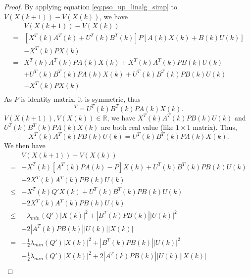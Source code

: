 \documentclass{sig-alternate}
\begin{document}
\begin{proof}
By applying equation \eqref{eq:pso_up_linalg_simp} to $ V( X(k+1) ) - V( X(k) ) $, we have
\begin{equation}
\label{eq:lyapunov_delta2}
\begin{aligned}
& V( X(k+1) ) - V( X(k) ) \\
= & [ X^{T}(k)  A^{T}(k) + U^{T}(k) B^{T}(k) ] P [ A(k) X(k) + B(k) U(k) ] \\ & - X^{T}(k) P X(k) \\
= & X^{T}(k)  A^{T}(k) P A(k) X(k) +  X^{T}(k)  A^{T}(k) P B(k) U(k) \\
& + U^{T}(k) B^{T}(k) P A(k) X(k) + U^{T}(k) B^{T}(k) P B(k) U(k) \\ & - X^{T}(k) P X(k) \\
\end{aligned}
\end{equation}
As $ P $ is identity matrix, it is symmetric, thus
\begin{equation}
[ X^{T}(k)  A^{T}(k) P B(k) U(k) ]^{T} =  U^{T}(k) B^{T}(k) P A(k) X(k).
\end{equation}
$ V( X(k+1) ) , V( X(k) ) \in \mathbb{R} $, 
we have $ X^{T}(k)  A^{T}(k) P B(k) U(k) $ and $  U^{T}(k) B^{T}(k) P A(k) X(k) $ are both real value (like $ 1 \times 1 $ matrix).
Thus, 
\begin{equation}
 X^{T}(k)  A^{T}(k) P B(k) U(k) =   U^{T}(k) B^{T}(k) P A(k) X(k) .
\end{equation}
We then have
\begin{equation}
\label{eq:lyapunov_delta3}
\begin{aligned}
& V( X(k+1) ) - V( X(k) ) \\
= & - X^{T}(k) [ A^{T}(k) P A(k) - P ] X(k) + U^{T}(k) B^{T}(k) P B(k) U(k)  \\
& + 2 X^{T}(k)  A^{T}(k) P B(k) U(k) \\
\leq & - X^{T}(k) Q' X(k)  + U^{T}(k) B^{T}(k) P B(k) U(k) \\
& + 2 X^{T}(k)  A^{T}(k) P B(k) U(k) \\
\leq & - \lambda_{min}(Q') | X(k) |^{2}  + | B^{T}(k) P B(k) | | U(k) |^{2} \\
& + 2  | A^{T}(k) P B(k) | | U(k) | | X(k) | \\
= & - \frac{1}{2} \lambda_{min}(Q') | X(k) |^{2} + | B^{T}(k) P B(k) | | U(k) |^{2} \\
& - \frac{1}{2} \lambda_{min}(Q') | X(k) |^{2} + 2  | A^{T}(k) P B(k) | | U(k) | | X(k) |  \\
\end{aligned}
\end{equation}
		

\end{proof}
\end{document}
